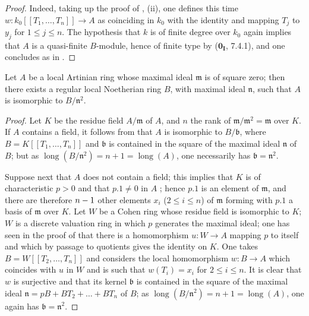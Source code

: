 \begin{proof}
Indeed, taking up the proof of , (ii), one defines this time $w:k_0[[T_1,\ldots,T_n]]\to A$ as coinciding in $k_0$ with the identity and mapping $T_j$ to $y_j$ for $1\leq j\leq n$.
The hypothesis that $k$ is of finite degree over $k_0$ again implies that $A$ is a quasi-finite $B$-module, hence of finite type by ($\mathbf{0_I}$, 7.4.1), and one concludes as in .
\end{proof}

\begin{corollary}[19.8.10]
\label{0.19.8.10}
Let $A$ be a local Artinian ring whose maximal ideal $\mathfrak{m}$ is of square zero; then there exists a regular local Noetherian ring $B$, with maximal ideal $\mathfrak{n}$, such that $A$ is isomorphic to $B/\mathfrak{n}^2$.
\end{corollary}

\begin{proof}
Let $K$ be the residue field $A/\mathfrak{m}$ of $A$, and $n$ the rank of $\mathfrak{m}/\mathfrak{m}^2=\mathfrak{m}$ over $K$.
If $A$ contains a field, it follows from  that $A$ is isomorphic to $B/\mathfrak{b}$, where $B=K[[T_1,\ldots,T_n]]$ and $\mathfrak{b}$ is contained in the square of the maximal ideal $\mathfrak{n}$ of $B$; but as $\operatorname{long}(B/\mathfrak{n}^2)=n+1=\operatorname{long}(A)$, one necessarily has $\mathfrak{b}=\mathfrak{n}^2$.

Suppose next that $A$ does not contain a field; this implies that $K$ is of characteristic $p>0$ and that $p.1\neq 0$ in $A$ ; hence $p.1$ is an element of $\mathfrak{m}$, and there are therefore $n- 1$ other elements $x_i$ ($2\leq i\leq n$) of $\mathfrak{m}$ forming with $p.1$ a basis of $\mathfrak{m}$ over $K$.
Let $W$ be a Cohen ring whose residue field is isomorphic to $K$; $W$ is a discrete valuation ring in which $p$ generates the maximal ideal; one has seen in the proof of  that there is a homomorphism $u:W\to A$ mapping $p$ to itself and which by passage to quotients gives the identity on $K$.
One takes $B=W[[T_2,\ldots,T_n]]$ and considers the local homomorphism $w:B\to A$ which coincides with $u$ in $W$ and is such that $w(T_i)=x_i$ for $2\leq i\leq n$.
It is clear that $w$ is surjective and that its kernel $\mathfrak{b}$ is contained in the square of the maximal ideal $\mathfrak{n}=pB+BT_2+\ldots+BT_n$ of $B$; as $\operatorname{long}(B/\mathfrak{n}^2)=n+1=\operatorname{long}(A)$, one again has $\mathfrak{b}=\mathfrak{n}^2$.
\end{proof}

